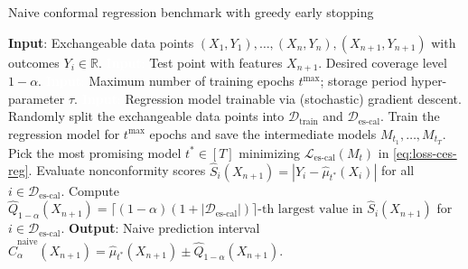 \begin{algorithm}[H]
    \caption{Naive conformal regression benchmark with greedy early stopping}
    \label{alg:naive-reg}
    \begin{algorithmic}[1]
        \STATE \textbf{Input}: Exchangeable data points $(X_{1},Y_{1}), \ldots, (X_{n},Y_{n}), (X_{n+1},Y_{n+1})$ with outcomes $Y_i \in \mathbb{R}$.
        \STATE \textcolor{white}{\textbf{Input}:} Test point with features $X_{n+1}$. Desired coverage level $1-\alpha$.
        \STATE \textcolor{white}{\textbf{Input}:} Maximum number of training epochs $t^{\max}$; storage period hyper-parameter $\tau$.
        \STATE \textcolor{white}{\textbf{Input}:} Regression model trainable via (stochastic) gradient descent.
        \STATE Randomly split the exchangeable data points into $\mathcal{D}_{\text{train}}$ and $\mathcal{D}_{\text{es-cal}}$.
        \STATE Train the regression model for $t^{\text{max}}$ epochs and save the intermediate models $M_{t_1} , \dots, M_{t_T}$.
        \STATE Pick the most promising model $t^* \in [T]$ minimizing $\mathcal{L}_{\text{es-cal}}(M_t)$ in \eqref{eq:loss-ces-reg}.
        \STATE Evaluate nonconformity scores $\hat{S}_i(X_{n+1}) = | Y_i - \hat{\mu}_{t^*}(X_{i})|$ for all $i \in \mathcal{D}_{\text{es-cal}}$.
        \STATE Compute $\hat{Q}_{1-\alpha}(X_{n+1}) = \lceil (1-\alpha)(1+|\mathcal{D}_{\text{es-cal}}|) \rceil\text{-th largest value in }
        \hat{S}_i(X_{n+1})$ for $i \in \mathcal{D}_{\text{es-cal}}$.
        \STATE \textbf{Output}: Naive prediction interval $\hat{C}^{\text{naive}}_{\alpha}(X_{n+1}) = \hat{\mu}_{t^*}(X_{n+1}) \pm \hat{Q}_{1-\alpha}(X_{n+1})$.
    \end{algorithmic}
\end{algorithm}


